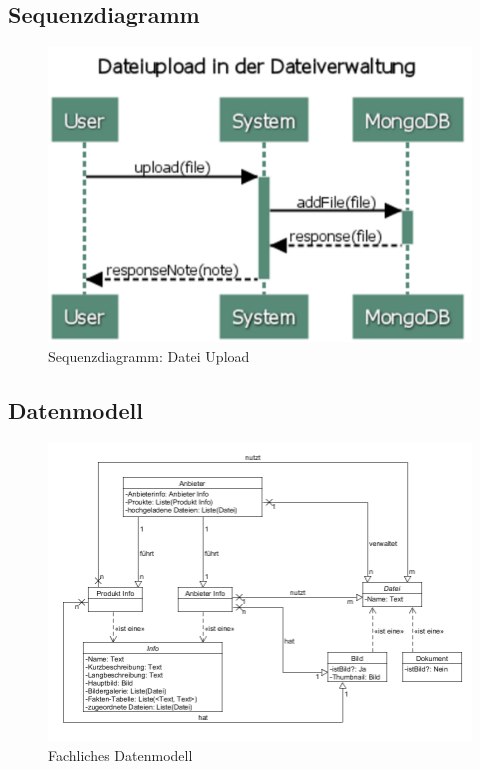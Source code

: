 \documentclass[a4paper,12pt]{article}
\begin{document}
\clearpage 

\subsection{Sequenzdiagramm}

\begin{figure}[!htb]
  \centering
     \includegraphics[width=.7\textwidth]{Sequenzdiagramm.png}
  \caption{Sequenzdiagramm: Datei Upload}
  \label{fig:file-upload}
\end{figure}

\clearpage

\subsection{Datenmodell}

\begin{figure}[!htb]
  \centering
     \includegraphics[width=1.0\textwidth]{FDM.png}
  \caption{Fachliches Datenmodell}
  \label{fig:fmd}
\end{figure}
\end{document}
